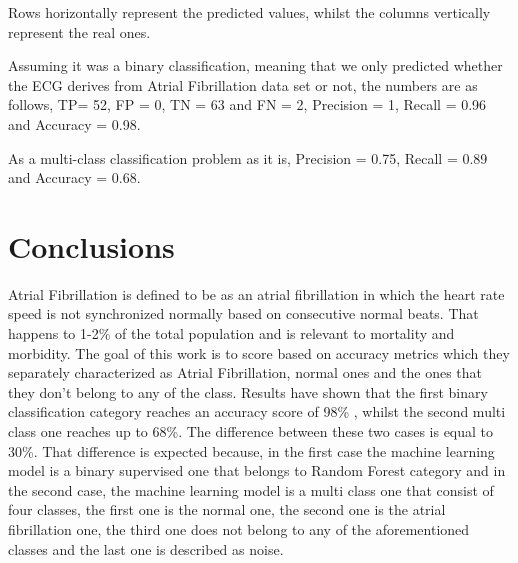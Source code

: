\documentclass[review]{elsarticle}
\begin{document}
Rows horizontally represent the predicted values, whilst the columns vertically represent the real ones.

Assuming it was a binary classification, meaning that we only predicted whether the ECG derives from Atrial Fibrillation data set or not, the numbers are as follows, TP= 52, FP = 0, TN = 63 and FN = 2, Precision = 1, Recall = 0.96 and Accuracy = 0.98. 

As a multi-class classification problem as it is, Precision = 0.75, Recall = 0.89 and Accuracy = 0.68. 

\section{Conclusions}
Atrial Fibrillation is defined to be as an atrial fibrillation in which the heart rate speed is not synchronized normally based on consecutive normal beats. That happens to 1-2\% of the total population and is relevant to mortality and morbidity. The goal of this work is to score based on accuracy metrics which they separately characterized as Atrial Fibrillation, normal ones and the ones that they don't belong to any of the class. 
Results have shown that the first binary classification category reaches an accuracy score of 98\% , whilst the second multi class one reaches up to 68\%. The difference between these two cases is equal to 30\%. That difference is expected because, in the first case the machine learning model is a binary supervised one that belongs to Random Forest category and in the second case, the machine learning model is a multi class one that consist of four classes, the first one is the normal one, the second one is the atrial fibrillation one, the third one does not belong to any of the aforementioned classes and the last one is described as noise. 
\end{document}
